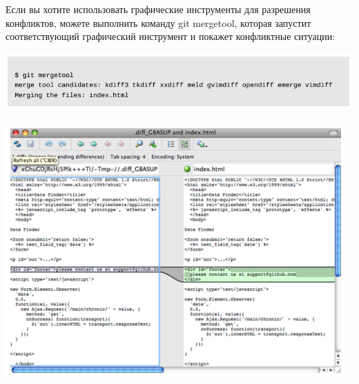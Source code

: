 \documentclass{beamer}
\begin{document}
\begin{frame}
Если вы хотите использовать графические инструменты для разрешения конфликтов, можете выполнить команду git mergetool, которая запустит соответствующий графический инструмент и покажет конфликтные
ситуации:
\begin{center}
\includegraphics[scale=0.4]{images/conf-05.png}
\end{center}
\begin{center}
\includegraphics[scale=0.4]{images/conf-06.png}
\end{center}
\end{frame}
\end{document}

